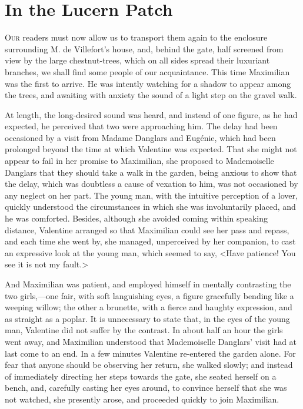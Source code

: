 \chapter{In the Lucern Patch} 

 \lettrine{O}{ur} readers must now allow us to transport them again to the enclosure surrounding M. de Villefort's house, and, behind the gate, half screened from view by the large chestnut-trees, which on all sides spread their luxuriant branches, we shall find some people of our acquaintance. This time Maximilian was the first to arrive. He was intently watching for a shadow to appear among the trees, and awaiting with anxiety the sound of a light step on the gravel walk. 

 At length, the long-desired sound was heard, and instead of one figure, as he had expected, he perceived that two were approaching him. The delay had been occasioned by a visit from Madame Danglars and Eugénie, which had been prolonged beyond the time at which Valentine was expected. That she might not appear to fail in her promise to Maximilian, she proposed to Mademoiselle Danglars that they should take a walk in the garden, being anxious to show that the delay, which was doubtless a cause of vexation to him, was not occasioned by any neglect on her part. The young man, with the intuitive perception of a lover, quickly understood the circumstances in which she was involuntarily placed, and he was comforted. Besides, although she avoided coming within speaking distance, Valentine arranged so that Maximilian could see her pass and repass, and each time she went by, she managed, unperceived by her companion, to cast an expressive look at the young man, which seemed to say, <Have patience! You see it is not my fault.> 

 And Maximilian was patient, and employed himself in mentally contrasting the two girls,—one fair, with soft languishing eyes, a figure gracefully bending like a weeping willow; the other a brunette, with a fierce and haughty expression, and as straight as a poplar. It is unnecessary to state that, in the eyes of the young man, Valentine did not suffer by the contrast. In about half an hour the girls went away, and Maximilian understood that Mademoiselle Danglars' visit had at last come to an end. In a few minutes Valentine re-entered the garden alone. For fear that anyone should be observing her return, she walked slowly; and instead of immediately directing her steps towards the gate, she seated herself on a bench, and, carefully casting her eyes around, to convince herself that she was not watched, she presently arose, and proceeded quickly to join Maximilian. 

